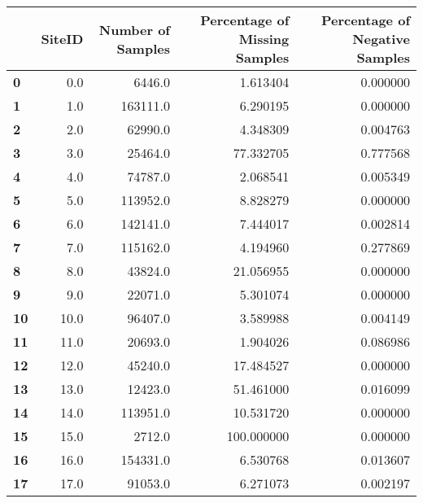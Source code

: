 \begin{tabular}{lrrrr}
\toprule
{} &  SiteID &  Number of Samples &  Percentage of Missing Samples &  Percentage of Negative Samples \\
\midrule
\textbf{0 } &     0.0 &             6446.0 &                       1.613404 &                        0.000000 \\
\textbf{1 } &     1.0 &           163111.0 &                       6.290195 &                        0.000000 \\
\textbf{2 } &     2.0 &            62990.0 &                       4.348309 &                        0.004763 \\
\textbf{3 } &     3.0 &            25464.0 &                      77.332705 &                        0.777568 \\
\textbf{4 } &     4.0 &            74787.0 &                       2.068541 &                        0.005349 \\
\textbf{5 } &     5.0 &           113952.0 &                       8.828279 &                        0.000000 \\
\textbf{6 } &     6.0 &           142141.0 &                       7.444017 &                        0.002814 \\
\textbf{7 } &     7.0 &           115162.0 &                       4.194960 &                        0.277869 \\
\textbf{8 } &     8.0 &            43824.0 &                      21.056955 &                        0.000000 \\
\textbf{9 } &     9.0 &            22071.0 &                       5.301074 &                        0.000000 \\
\textbf{10} &    10.0 &            96407.0 &                       3.589988 &                        0.004149 \\
\textbf{11} &    11.0 &            20693.0 &                       1.904026 &                        0.086986 \\
\textbf{12} &    12.0 &            45240.0 &                      17.484527 &                        0.000000 \\
\textbf{13} &    13.0 &            12423.0 &                      51.461000 &                        0.016099 \\
\textbf{14} &    14.0 &           113951.0 &                      10.531720 &                        0.000000 \\
\textbf{15} &    15.0 &             2712.0 &                     100.000000 &                        0.000000 \\
\textbf{16} &    16.0 &           154331.0 &                       6.530768 &                        0.013607 \\
\textbf{17} &    17.0 &            91053.0 &                       6.271073 &                        0.002197 \\
\bottomrule
\end{tabular}
